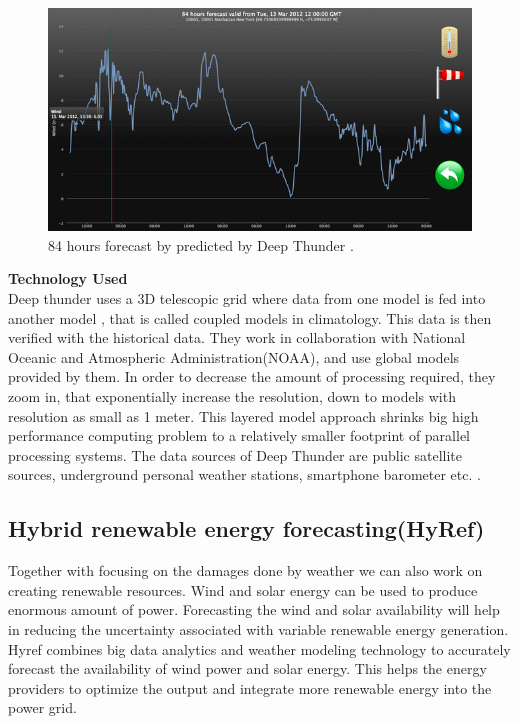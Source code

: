 \documentclass[sigconf]{acmart}
\begin{document}
\begin{figure}
\includegraphics{images/Deep thunder.png}
\caption{84 hours forecast by predicted by Deep Thunder \cite{DeepImage}.}
\end{figure}


\textbf{Technology Used} \\

Deep thunder uses a 3D telescopic grid where data from one model is fed into another model , that is called coupled models in climatology. This data is then verified with the historical data. They work in collaboration with National Oceanic and Atmospheric Administration(NOAA), and use global models provided by them. In order to decrease the amount of processing required, they zoom in, that exponentially increase the resolution, down to models with resolution as small as 1 meter. This layered model approach shrinks big high performance computing problem to a relatively smaller footprint of parallel processing systems. The data sources of Deep Thunder are public satellite sources, underground personal weather stations, smartphone barometer etc. \cite{Deep01}.


\subsection{Hybrid renewable energy forecasting(HyRef)}


Together with focusing on the damages done by weather we can also work on creating renewable resources. Wind and solar energy can be used to produce enormous amount of power. Forecasting the wind and solar availability will help in reducing the uncertainty associated with variable renewable energy generation.
Hyref combines big data analytics and weather modeling technology to accurately forecast the availability of wind power and solar energy. This helps the  energy providers to optimize the output and integrate more renewable energy into the power grid\cite{Hyref02}.\\
\end{document}
